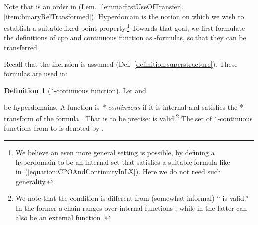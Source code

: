 \documentclass[envcountsect,orivec]{llncs} \pdfoutput=1
\newif\ifignore \ignorefalse
\newcommand{\auxproof}[1]{
\ifignore\mbox{}\newline
\textbf{BEGIN: AUX-PROOF} \dotfill\newline
{#1}\mbox{}\newline
\textbf{END: AUX-PROOF}\dotfill\newline
\fi}
\newtheorem{mylem}[mythm]{Lemma}
\theoremstyle{definition}
\newtheorem{mydef}[mythm]{Definition}
\def\myqed{\qed}
\begin{document}
 Note that  is an order in 
 (Lem.~\ref{lemma:firstUseOfTransfer}.\ref{item:binaryRelTransformed}).
 Hyperdomain is the notion on which we wish to establish a suitable fixed point
 property.\footnote{We believe an even more general setting is possible, by defining a hyperdomain to be an internal set 
 that satisfies a suitable formula like
  in~(\ref{equation:CPOAndContinuityInLX}). Here we
 do not need such generality.}  Towards that goal, we first formulate
 the definitions of cpo and continuous function as
 -formulas, so that they can be transferred.

 Recall that the inclusion  is assumed
 (Def.~\ref{definition:superstructure}).  These formulas are used in:
 

\auxproof{
*** This notion is problematic since the formula
 cannot *-transformed easily.  In particular,
 the quantifier  is a syntax sugar and we do not know 
 how to *-transform it ****
\begin{mydef}[*-Cpo]\label{definition:*cpo}
Let  and  be an order on . The pair  is
 said to be
 a \emph{*-cpo} in  if the formula
 
 is valid in .
\end{mydef}


The *-transform of the prefix order  on 
(Lem.~\ref{lemma:streamsFormCpo}) 
is an order 
between hyperstreams (Lem.~\ref{lemma:firstUseOfTransfer}.\ref{item:binaryRelTransformed}).
\begin{mylem}\label{lemma:hyperstreamForm*CPO}
 The set  of hyperstreams, together with
 , constitutes a *-cpo in .
\end{mylem}
\begin{myproof}
 The formula  is closed and
 valid in  (Lem.~\ref{lemma:streamsFormCpo}). Thus by transfer,
 we have .
\myqed
\end{myproof}
}


\begin{mydef}[*-continuous function]\label{definition:*contiFunc}
 Let  and
 
be  hyperdomains. A function
  is
 \emph{*-continuous} if it is internal and satisfies the *-transform of the formula
 . That
 is 
 to be precise:
  is valid.\footnote{We note that the condition is different from
 (somewhat informal) `` is valid.'' In the former a chain  ranges over internal functions , while in the latter  can also be an external
 function .}
 The set of *-continuous functions from 
to  is denoted by .
\end{mydef}
\end{document}

